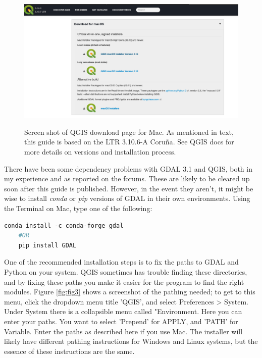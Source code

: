 \documentclass{article}
\begin{document}
\begin{figure}[htbp]
    \centering
    \includegraphics[width=\textwidth]{Figure2_Downloads.png}
    \label{fig:fig2}
    \caption{Screen shot of QGIS download page for Mac. As mentioned in text, this guide is based on the LTR 3.10.6-A Coru\~na. See QGIS docs for more details on versions and installation process.}
\end{figure}

There have been some dependency problems with GDAL 3.1 and QGIS, both in my experience and as reported on the forums. These are likely to be cleared up soon after this guide is published. However, in the event they aren't, it might be wise to install \textit{conda} or \textit{pip} versions of GDAL in their own environments. Using the Terminal on Mac, type one of the following:

\begin{lstlisting}[language=Python]
    conda install -c conda-forge gdal 
    #OR
    pip install GDAL
\end{lstlisting}

One of the recommended installation steps is to fix the paths to GDAL and Python on your system. QGIS sometimes has trouble finding these directories, and by fixing these paths you make it easier for the program to find the right modules. Figure \ref{fig:fig3} shows a screenshot of the pathing needed; to get to this menu, click the dropdown menu title 'QGIS', and select Preferences > System. Under System there is a collapsible menu called "Environment. Here you can enter your paths. You want to select 'Prepend' for APPLY, and 'PATH' for Variable. Enter the paths as described here if you use Mac. The installer will likely have different pathing instructions for Windows and Linux systems, but the essence of these instructions are the same. 
\end{document}
